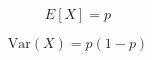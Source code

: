 \documentclass{article}
\begin{document}
\[
E[X] = p
\]

\[
\text{Var}(X) = p(1 - p)
\]
\end{document}
